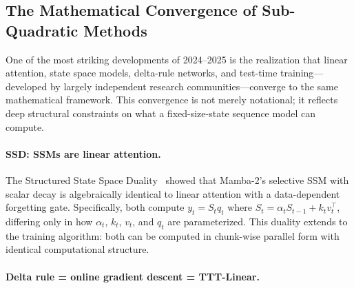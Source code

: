 \documentclass[11pt,a4paper]{article}
\begin{document}
\subsection{The Mathematical Convergence of Sub-Quadratic Methods}
\label{subsec:convergence}

One of the most striking developments of 2024--2025 is the realization that linear attention, state space models, delta-rule networks, and test-time training---developed by largely independent research communities---converge to the same mathematical framework. This convergence is not merely notational; it reflects deep structural constraints on what a fixed-size-state sequence model can compute.

\paragraph{SSD: SSMs are linear attention.}
The Structured State Space Duality~\cite{dao2024mamba2} showed that Mamba-2's selective SSM with scalar decay is algebraically identical to linear attention with a data-dependent forgetting gate. Specifically, both compute $y_t = S_t q_t$ where $S_t = \alpha_t S_{t-1} + k_t v_t^\top$, differing only in how $\alpha_t$, $k_t$, $v_t$, and $q_t$ are parameterized. This duality extends to the training algorithm: both can be computed in chunk-wise parallel form with identical computational structure.

\paragraph{Delta rule = online gradient descent = TTT-Linear.}
\end{document}
